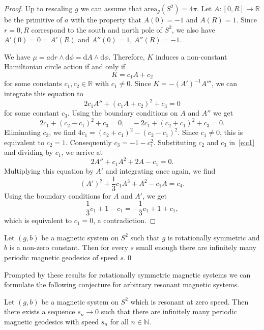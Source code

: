 \documentclass[AHL,Unicode,longabstracts,published]{cedram}
\newcommand{\N}{\mathbb{N}}
\newcommand{\R}{\mathbb{R}}
\newcommand{\diff}{\mathrm{d}}
\newcommand{\area}{\mathrm{area}}
\begin{document}
\begin{proof}
Up to rescaling $g$ we can assume that $\area_g(S^2)=4\pi$. Let $A:[0,R]\to\R$ be the primitive of $a$ with the property that $A(0)=-1$ and $A(R)=1$. Since $r=0,R$ correspond to the south and north pole of $S^2$, we also have $A'(0)=0=A'(R)$ and $A''(0)=1$, $A''(R)=-1$.

We have $\mu=a\diff r\wedge\diff\phi=\diff A\wedge\diff\phi$. Therefore, $K$ induces a non-constant Hamiltonian circle action if and only if
\[
K=c_1A+c_2
\]
for some constants $c_1,c_2\in\R$ with $c_1\neq0$. Since $K=-(A')^{-1}A'''$, we can integrate this equation to
\begin{equation}\label{e:c1}
2c_1A''+\left(c_1A+c_2\right)^2+c_3=0
\end{equation}
for some constant $c_3$. Using the boundary conditions on $A$ and $A''$ we get
\[
2c_1+\left(c_2-c_1\right)^2+c_3=0,\quad -2c_1+\left(c_2+c_1\right)^2+c_3=0.
\]
Eliminating $c_3$, we find $4c_1=(c_2+c_1)^2-(c_2-c_1)^2$. Since $c_1\neq0$, this is equivalent to $c_2=1$. Consequently $c_3=-1-c_1^2$. Substituting $c_2$ and $c_3$ in~\eqref{e:c1} and dividing by $c_1$, we arrive at
\[
2A''+c_1A^2+2A-c_1=0.
\]
Multiplying this equation by $A'$ and integrating once again, we find
\[
(A')^2+\frac13c_1A^3+A^2-c_1A=c_4.
\]
Using the boundary conditions for $A$ and $A'$, we get
\[
\frac13c_1+1-c_1=-\frac13c_1+1+c_1,
\]
which is equivalent to $c_1=0$, a contradiction.
\end{proof}

\begin{coro}\label{c:rotinf}
Let $(g,b)$ be a magnetic system on $S^2$ such that $g$ is rotationally symmetric and $b$ is a non-zero constant. Then for every $s$ small enough there are infinitely many periodic magnetic geodesics of speed $s$.\qed
\end{coro}

Prompted by these results for rotationally symmetric magnetic systems we can formulate the following conjecture for arbitrary resonant magnetic systems.

\begin{conj*}
Let $(g,b)$ be a magnetic system on $S^2$ which is resonant at zero speed. Then there exists a sequence $s_n\to 0$ such that there are infinitely many periodic magnetic geodesics with speed $s_n$ for all $n\in\N$.
\end{conj*}
\end{document}

